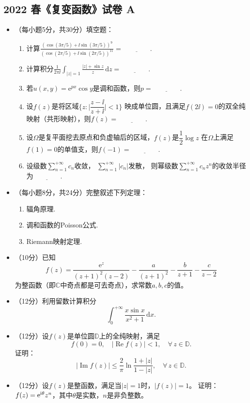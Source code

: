 \subsection*{2022 春《复变函数》试卷 A}
\begin{itemize}
\item[一、]（每小题5分，共30分）填空题：
\begin{enumerate}[label=(\arabic*)]
\item 计算$\displaystyle\frac{(\cos(3\pi/5)+\ii\sin(3\pi/5))^9}
{(\cos(2\pi/5)+\ii\sin(2\pi/5))^{11}}=\underline{\qquad\qquad}$.
\item 计算积分$\displaystyle\frac{1}{2\pi\ii}
\int_{|z|=1}\frac{|z|+\sin z}{z}\,\mathrm{d}z=\underline{\qquad\qquad}$.
\item 若$u(x,y)=\mathrm{e}^{px}\cos y$是调和函数，则$p=\underline{\qquad\qquad}$.
\item 设$f(z)$是将区域$\bigg\{z:\Big|\dfrac{z-\ii}{z+\ii}\Big|<1\bigg\}$
映成单位圆，且满足$f(2\ii)=0$的双全纯映射（共形映射），则$f(z)=\underline{\qquad\qquad}$.
\item 设$\Omega$是复平面挖去原点和负虚轴后的区域，$f(z)$是$\dfrac{1}{2}\log z$
在$\Omega$上满足$f(1)=0$的单值支，则$f(-1)=\underline{\qquad\qquad}$.
\item 设级数$\sum\limits_{n=1}^{+\infty}c_n$收敛，
$\sum\limits_{n=1}^{+\infty}|c_n|$发散，
则幂级数$\sum\limits_{n=1}^{+\infty}c_nz^n$的收敛半径为$\underline{\qquad\qquad}$.
\end{enumerate}
\item[二、]（每小题8分，共24分）完整叙述下列定理：
\begin{enumerate}[label=(\arabic*)]
    \item 辐角原理.
    \item 调和函数的Poisson公式.
    \item Riemann映射定理.
\end{enumerate}
\item[三、]（10分）已知
\[f(z)=\frac{\mathrm{e}^z}{(z+1)^2(z-2)}
-\frac{a}{(z+1)^2}-\frac{b}{z+1}-\frac{c}{z-2}\]
为整函数（即$\mathbb{C}$中奇点都是可去奇点），求常数$a,b,c$的值。
\item[四、]（12分）利用留数计算积分
\[\int_0^{+\infty}\frac{x\sin x}{x^2+1}\,\mathrm{d}x.\]
\item[五、]（12分）设$f(z)$是单位圆$\mathbb{D}$上的全纯映射，满足
\[f(0)=0,\quad|\operatorname{Re}f(z)|<1,\quad\forall\,z\in\mathbb{D}.\]
证明：
\[|\operatorname{Im}f(z)|\le\frac{2}{\pi}\ln\frac{1+|z|}{1-|z|},\quad\forall\,z\in\mathbb{D}.\]
\item[六、]（12分）设$f(z)$是整函数，满足当$|z|=1$时，$|f(z)|=1$。
证明：$f(z)={\rm e}^{\mathrm{i}\theta}z^n$，其中$\theta$是实数，$n$是非负整数。
\end{itemize}

